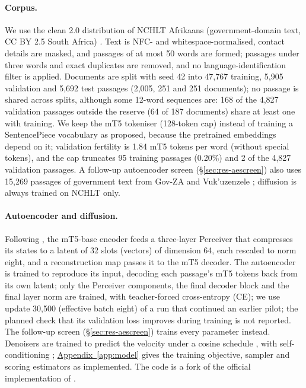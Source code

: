 \documentclass[11pt,a4paper]{article}
\begin{document}
\paragraph{Corpus.} We use the clean 2.0 distribution of NCHLT Afrikaans (government-domain text, CC BY 2.5 South Africa) \citep{eiselen2014developing}. Text is NFC- and whitespace-normalised, contact details are masked, and passages of at most 50 words are formed; passages under three words and exact duplicates are removed, and no language-identification filter is applied. Documents are split with seed 42 into 47,767 training, 5,905 validation and 5,692 test passages (2,005, 251 and 251 documents); no passage is shared across splits, although some 12-word sequences are: 168 of the 4,827 validation passages outside the reserve (64 of 187 documents) share at least one with training. We keep the mT5 tokeniser (128-token cap) instead of training a SentencePiece vocabulary \citep{kudo2018sentencepiece} as proposed, because the pretrained embeddings depend on it; validation fertility is 1.84 mT5 tokens per word (without special tokens), and the cap truncates 95 training passages (0.20\%) and 2 of the 4,827 validation passages. A follow-up autoencoder screen (\S\ref{sec:res-aescreen}) also uses 15,269 passages of government text from Gov-ZA and Vuk'uzenzele \citep{lastrucci2023preparing}; diffusion is always trained on NCHLT only.

\paragraph{Autoencoder and diffusion.} Following \citet{lovelace2023latent}, the mT5-base encoder feeds a three-layer Perceiver \citep{jaegle2021perceiver} that compresses its states to a latent of 32 slots (vectors) of dimension 64, each rescaled to norm eight, and a reconstruction map passes it to the mT5 decoder. The autoencoder is trained to reproduce its input, decoding each passage's mT5 tokens back from its own latent; only the Perceiver components, the final decoder block and the final layer norm are trained, with teacher-forced cross-entropy (CE); we use update 30,500 (effective batch eight) of a run that continued an earlier pilot; the planned check that its validation loss improves during training is not reported. The follow-up screen (\S\ref{sec:res-aescreen}) trains every parameter instead. Denoisers are trained to predict the velocity \citep{salimans2022progressive} under a cosine schedule \citep{nichol2021improved}, with self-conditioning \citep{chen2023analog}; \hyperref[app:model]{Appendix~\ref*{app:model}} gives the training objective, sampler and scoring estimators as implemented. The code is a fork of the official implementation of \citet{lovelace2023latent}.
\end{document}
